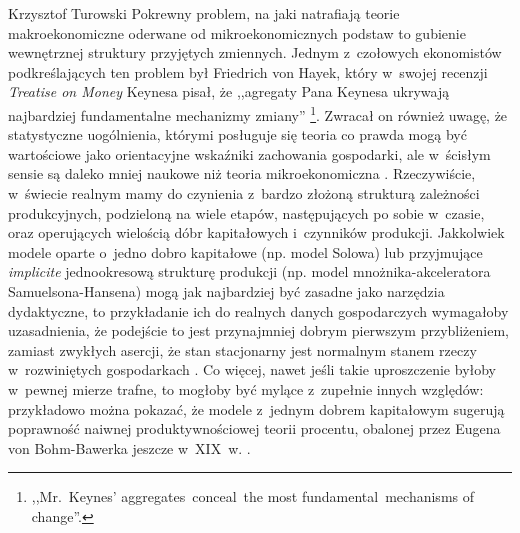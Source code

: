 \begin{artplenv}{Krzysztof Turowski}
Pokrewny problem, na jaki natrafiają teorie makroekonomiczne oderwane od mikroekonomicznych podstaw to gubienie
wewnętrznej struktury przyjętych zmiennych. Jednym z~czołowych ekonomistów podkreślających ten problem był Friedrich
von Hayek, który w~swojej recenzji \textit{Treatise on Money} Keynesa pisał, że ,,agregaty Pana Keynesa ukrywają
najbardziej fundamentalne mechanizmy zmiany''
\parencite[s.~277]{hayek_reflections_1931}\footnote{,,Mr.~Keynes'
aggregates~conceal~the most fundamental~mechanisms of change''.}. Zwracał on również uwagę, że statystyczne uogólnienia,
którymi posługuje się teoria co prawda mogą być wartościowe jako orientacyjne wskaźniki zachowania gospodarki,
ale w~ścisłym sensie są daleko mniej naukowe niż teoria mikroekonomiczna
\parencite{hayek_competition_2002}.
Rzeczywiście, w~świecie realnym mamy do czynienia z~bardzo złożoną strukturą zależności produkcyjnych, podzieloną na
wiele etapów, następujących po sobie w~czasie, oraz operujących wielością dóbr kapitałowych i~czynników produkcji.
Jakkolwiek modele oparte o~jedno dobro kapitałowe (np. model Solowa) lub przyjmujące \textit{implicite} jednookresową
strukturę produkcji (np. model mnożnika-akceleratora Samuelsona-Hansena) mogą jak najbardziej być zasadne jako
narzędzia dydaktyczne, to przykładanie ich do realnych danych gospodarczych wymagałoby uzasadnienia, że podejście to
jest przynajmniej dobrym pierwszym przybliżeniem, zamiast zwykłych asercji, że stan stacjonarny jest normalnym stanem
rzeczy w~rozwiniętych gospodarkach
\parencite{solow_growth_1970}.
Co więcej, nawet jeśli takie uproszczenie
byłoby w~pewnej mierze trafne, to mogłoby być mylące z~zupełnie innych względów: przykładowo można pokazać, że modele z~jednym
dobrem kapitałowym sugerują poprawność naiwnej produktywnościowej teorii procentu, obalonej przez Eugena von
Bohm-Bawerka jeszcze w~XIX~w.
\parencite{murphy_dangers_2005}.


\end{artplenv}
